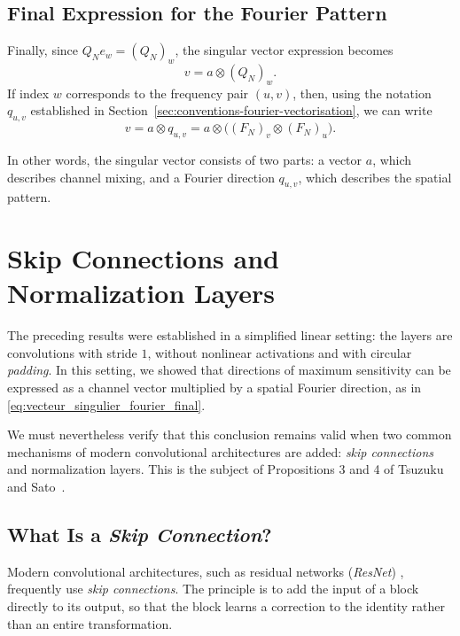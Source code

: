 \subsection{Final Expression for the Fourier Pattern}

Finally, since $Q_N e_w = (Q_N)_w$, the singular vector expression becomes
\[
    v
    =
    a \otimes (Q_N)_w.
\]
If index $w$ corresponds to the frequency pair $(u,v)$, then, using the notation $q_{u,v}$ established
in Section~\ref{sec:conventions-fourier-vectorisation}, we can write
\begin{equation}
    v
    =
    a \otimes q_{u,v}
    =
    a \otimes \bigl((F_N)_v \otimes (F_N)_u\bigr).
    \label{eq:vecteur_singulier_fourier_final}
\end{equation}

In other words, the singular vector consists of two parts: a vector $a$, which describes
channel mixing, and a Fourier direction $q_{u,v}$, which describes the spatial pattern.

\section{Skip Connections and Normalization Layers}
\label{sec:skip-normalisation}

The preceding results were established in a simplified linear setting: the layers are convolutions
with stride $1$, without nonlinear activations and with circular \textit{padding}. In this setting, we showed that directions of maximum sensitivity can be expressed as
a channel vector multiplied by a spatial Fourier direction, as in
\eqref{eq:vecteur_singulier_fourier_final}.

We must nevertheless verify that this conclusion remains valid when two common mechanisms
of modern convolutional architectures are added: \textit{skip connections} and normalization layers. This is
the subject of Propositions 3 and 4 of Tsuzuku and Sato~\cite{tsuzuku2019structural}.

\subsection{What Is a \textit{Skip Connection}?}

Modern convolutional architectures, such as residual networks (\textit{ResNet}) \cite{he2016deep},
frequently use \textit{skip connections}.
The principle is to add the input of a block directly to its output, so that the block learns
a correction to the identity rather than an entire transformation.

